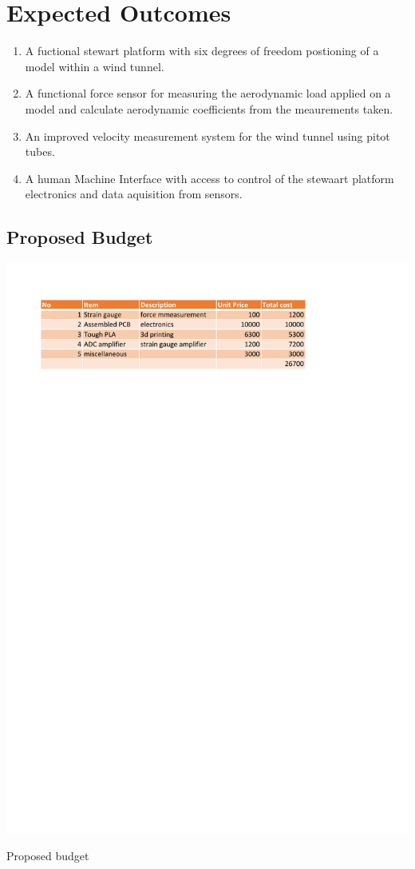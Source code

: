 \section{Expected Outcomes}
\begin{enumerate}
\item A fuctional stewart platform with six degrees of freedom postioning of a model within a wind tunnel.
\item A functional force sensor for measuring the aerodynamic load applied on a model and calculate aerodynamic coefficients from the meaurements taken.
\item An improved velocity measurement system for the wind tunnel using pitot tubes.
\item A human Machine Interface with access to control  of the stewaart platform electronics and data aquisition from sensors.
\end{enumerate}
\newpage
\subsection{Proposed Budget}
\begin{center}
\begin{table}[!h]
\centering
\includegraphics{Figures/budget}
\caption{Proposed budget}
\end{table}
\end{center}

